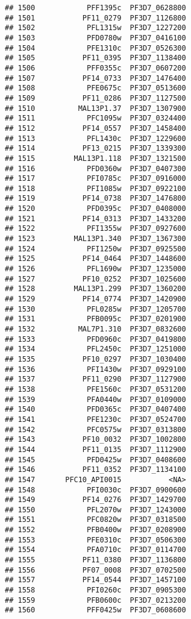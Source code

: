 \documentclass{article}\usepackage[]{graphicx}\usepackage[]{color}
\makeatletter
\newenvironment{kframe}{%
 \def\at@end@of@kframe{}%
 \ifinner\ifhmode%
  \def\at@end@of@kframe{\end{minipage}}%
  \begin{minipage}{\columnwidth}%
 \fi\fi%
 \def\FrameCommand##1{\hskip\@totalleftmargin \hskip-\fboxsep
 \colorbox{shadecolor}{##1}\hskip-\fboxsep
     \hskip-\linewidth \hskip-\@totalleftmargin \hskip\columnwidth}%
 \MakeFramed {\advance\hsize-\width
   \@totalleftmargin\z@ \linewidth\hsize
   \@setminipage}}%
 {\par\unskip\endMakeFramed%
 \at@end@of@kframe}
\newenvironment{knitrout}{}{} %
\makeatother
\begin{document}
\begin{knitrout}
\begin{kframe}
\begin{verbatim}
## 1500            PFF1395c  PF3D7_0628800
## 1501           PF11_0279  PF3D7_1126800
## 1502            PFL1315w  PF3D7_1227200
## 1503            PFD0780w  PF3D7_0416100
## 1504            PFE1310c  PF3D7_0526300
## 1505           PF11_0395  PF3D7_1138400
## 1506            PFF0355c  PF3D7_0607200
## 1507           PF14_0733  PF3D7_1476400
## 1508            PFE0675c  PF3D7_0513600
## 1509           PF11_0286  PF3D7_1127500
## 1510          MAL13P1.37  PF3D7_1307900
## 1511            PFC1095w  PF3D7_0324400
## 1512           PF14_0557  PF3D7_1458400
## 1513            PFL1430c  PF3D7_1229600
## 1514           PF13_0215  PF3D7_1339300
## 1515         MAL13P1.118  PF3D7_1321500
## 1516            PFD0360w  PF3D7_0407300
## 1517            PFI0785c  PF3D7_0916000
## 1518            PFI1085w  PF3D7_0922100
## 1519           PF14_0738  PF3D7_1476800
## 1520            PFD0395c  PF3D7_0408000
## 1521           PF14_0313  PF3D7_1433200
## 1522            PFI1355w  PF3D7_0927600
## 1523         MAL13P1.340  PF3D7_1367300
## 1524            PFI1250w  PF3D7_0925500
## 1525           PF14_0464  PF3D7_1448600
## 1526            PFL1690w  PF3D7_1235000
## 1527           PF10_0252  PF3D7_1025600
## 1528         MAL13P1.299  PF3D7_1360200
## 1529           PF14_0774  PF3D7_1420900
## 1530            PFL0285w  PF3D7_1205700
## 1531            PFB0095c  PF3D7_0201900
## 1532          MAL7P1.310  PF3D7_0832600
## 1533            PFD0960c  PF3D7_0419800
## 1534            PFL2450c  PF3D7_1251000
## 1535           PF10_0297  PF3D7_1030400
## 1536            PFI1430w  PF3D7_0929100
## 1537           PF11_0290  PF3D7_1127900
## 1538            PFE1560c  PF3D7_0531200
## 1539            PFA0440w  PF3D7_0109000
## 1540            PFD0365c  PF3D7_0407400
## 1541            PFE1230c  PF3D7_0524700
## 1542            PFC0575w  PF3D7_0313800
## 1543           PF10_0032  PF3D7_1002800
## 1544           PF11_0135  PF3D7_1112900
## 1545            PFD0425w  PF3D7_0408600
## 1546           PF11_0352  PF3D7_1134100
## 1547       PFC10_API0015           <NA>
## 1548            PFI0030c  PF3D7_0900600
## 1549           PF14_0276  PF3D7_1429700
## 1550            PFL2070w  PF3D7_1243000
## 1551            PFC0820w  PF3D7_0318500
## 1552            PFB0400w  PF3D7_0208900
## 1553            PFE0310c  PF3D7_0506300
## 1554            PFA0710c  PF3D7_0114700
## 1555           PF11_0380  PF3D7_1136800
## 1556           PF07_0008  PF3D7_0702500
## 1557           PF14_0544  PF3D7_1457100
## 1558            PFI0260c  PF3D7_0905300
## 1559            PFB0600c  PF3D7_0213200
## 1560            PFF0425w  PF3D7_0608600

\end{verbatim}
\end{kframe}
\end{knitrout}
\end{document}

